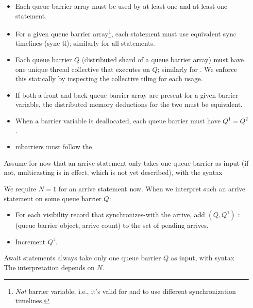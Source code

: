 \filbreak
\begin{itemize}
  \item Each queue barrier array must be used by at least one  and at least one  statement.
  \filbreak
  \item For a given queue barrier array\footnote{\textit{Not} barrier variable, i.e., it's valid for  and  to use different synchronization timelines.}, each  statement must use equivalent sync timelines (sync-tl); similarly for all  statements.
  \filbreak
  \item Each queue barrier $Q$ (distributed shard of a queue barrier array) must have one unique thread collective that executes  on $Q$; similarly for .
    We enforce this statically by inspecting the collective tiling for each usage.
  \filbreak
  \item If both a front and back queue barrier array are present for a given barrier variable, the distributed memory deductions for the two must be equivalent.
  \filbreak
  \item When a barrier variable is deallocated, each queue barrier must have $Q^1 = Q^2$.
  \filbreak
  \item mbarriers must follow the 
\end{itemize}

\filbreak
{}

Assume for now that an arrive statement only takes one queue barrier as input (if not, multicasting is in effect, which is not yet described), with the syntax\\

\filbreak
We require $N = 1$ for an arrive statement now.
When we interpret such an arrive statement on some queue barrier $Q$:
\begin{itemize}
  \item For each visibility record that synchronizes-with the arrive, add $(Q, Q^1)$ : (queue barrier object, arrive count) to the set of pending arrives.
  \item Increment $Q^1$.
\end{itemize}

\filbreak
{}

Await statements always take only one queue barrier $Q$ as input, with syntax\\
The interpretation depends on $N$.

